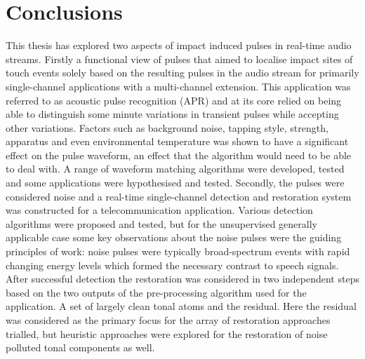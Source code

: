 \def\baselinestretch{1}
\chapter{Conclusions}\label{ch:Conclusions}
\ifpdf
    \graphicspath{{Conclusions/ConclusionsFigs/PNG/}{Conclusions/ConclusionsFigs/PDF/}{Conclusions/ConclusionsFigs/}}
\else
    \graphicspath{{Conclusions/ConclusionsFigs/EPS/}{Conclusions/ConclusionsFigs/}}
\fi

\def\baselinestretch{1.6}


This thesis has explored two aspects of impact induced pulses in real-time audio streams. Firstly a functional view of pulses that aimed to localise impact sites of touch events solely based on the resulting pulses in the audio stream for primarily single-channel applications with a multi-channel extension. This application was referred to as acoustic pulse recognition (APR) and at its core relied on being able to distinguish some minute variations in transient pulses while accepting other variations. Factors such as background noise, tapping style, strength, apparatus and even environmental temperature was shown to have a significant effect on the pulse waveform, an effect that the algorithm would need to be able to deal with. A range of waveform matching algorithms were developed, tested and some applications were hypothesised and tested.
Secondly, the pulses were considered noise and a real-time single-channel detection and restoration system was constructed for a telecommunication application. Various detection algorithms were proposed and tested, but for the unsupervised generally applicable case some key observations about the noise pulses were the guiding principles of work: noise pulses were typically broad-spectrum events with rapid changing energy levels which formed the necessary contrast to speech signals. After successful detection the restoration was considered in two independent steps based on the two outputs of the pre-processing algorithm used for the application. A set of largely clean tonal atoms and the residual. Here the residual was considered as the primary focus for the array of restoration approaches trialled, but heuristic approaches were explored for the restoration of noise polluted tonal components as well.

